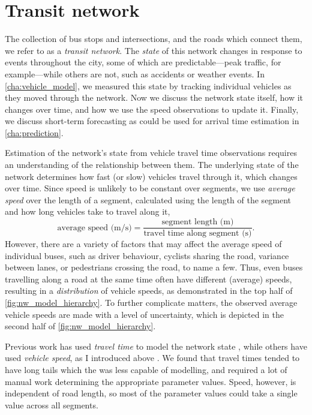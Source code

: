 \chapter{Transit network}
\label{cha:network_model}


The collection of bus stops and intersections, and the roads which connect them, we refer to as a \emph{transit network}. The \emph{state} of this network changes in response to events throughout the city, some of which are predictable---peak traffic, for example---while others are not, such as accidents or weather events. In \cref{cha:vehicle_model}, we measured this state by tracking individual vehicles as they moved through the network. Now we discuss the network state itself, how it changes over time, and how we use the speed observations to update it. Finally, we discuss short-term forecasting as could be used for arrival time estimation in \cref{cha:prediction}.


Estimation of the network's state from vehicle travel time observations requires an understanding of the relationship between them. The underlying state of the network determines how fast (or slow) vehicles travel through it, which changes over time. Since speed is unlikely to be constant over segments, we use \emph{average speed} over the length of a segment, calculated using the length of the segment and how long vehicles take to travel along it,
\begin{equation}
\label{eq:ch4:average_speed_formula}
\text{average speed (m/s)} = \frac{
\text{segment length (m)}
}{
\text{travel time along segment (s)}
}.
\end{equation}
However, there are a variety of factors that may affect the average speed of individual buses, such as driver behaviour, cyclists sharing the road, variance between lanes, or pedestrians crossing the road, to name a few. Thus, even buses travelling along a road at the same time often have different (average) speeds, resulting in a \emph{distribution} of vehicle speeds, as demonstrated in the top half of \cref{fig:nw_model_hierarchy}. To further complicate matters, the observed average vehicle speeds are made with a level of uncertainty, which is depicted in the second half of \cref{fig:nw_model_hierarchy}.


Previous work has used \emph{travel time} to model the network state \citep{Yu_2011,Cats_2015,Gong_2013,Shalaby_2004,Reinhoudt_1997}, while others have used \emph{vehicle speed}, as I introduced above \citep{Ma_2019,Celan_2017,Celan_2018,Xinghao_2013}. We found that travel times tended to have long tails which the \kf{} was less capable of modelling, and required a lot of manual work determining the appropriate parameter values. Speed, however, is independent of road length, so most of the parameter values could take a single value across all segments.


